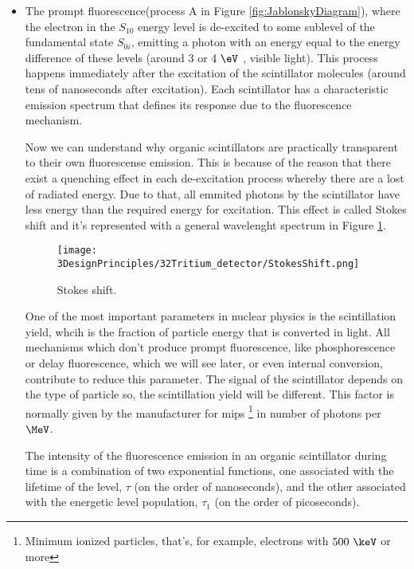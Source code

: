 \begin{itemize}

\item{} The prompt fluorescence(process A in Figure \ref{fig:JablonskyDiagram}), where the electron in the $S_{10}$ energy level  is de-excited to some sublevel of the fundamental state $S_{0i}$, emitting a photon with an energy equal to the energy difference of these levels (around $3$ or $4~\eV$ , visible light). This process happens immediately after the excitation of the scintillator molecules (around tens of nanoseconds after excitation). Each scintillator has a characteristic emission spectrum that defines its response due to the fluorescence mechanism. 

Now we can understand why organic scintillators are practically transparent to their own fluorescense emission. This is because of the reason that there exist a quenching effect in each de-excitation process whereby there are a lost of radiated energy. Due to that, all emmited  photons by the scintillator have less energy than the required energy for excitation. This effect is called Stokes shift and it's represented with a general wavelenght spectrum in Figure \ref{fig:StokesShift}.

\begin{figure}[htbp]
\centering
\texttt{[image: 3DesignPrinciples/32Tritium\_detector/StokesShift.png]}
\caption{Stokes shift.\label{fig:StokesShift}~\cite{Knoll}}
\end{figure}

One of the most important parameters in nuclear physics is the scintillation yield, whcih is the fraction of particle energy that is converted in light. All mechanisms which don't produce prompt fluorescence, like phosphorescence or delay fluorescence, which we will see later, or even internal conversion, contribute to reduce this parameter. The signal of the scintillator depends on the type of particle so, the scintillation yield will be different. This factor is normally given by the manufacturer for mips \footnote{Minimum ionized particles, that's, for example, electrons with $500~\keV$ or more} in number of photons per $\MeV$.

The intensity of the fluorescence emission in an organic scintillator during time is a combination of two exponential functions, one associated with the lifetime of the level, $\tau$ (on the order of nanoseconds), and the other associated with the energetic level population, $\tau_1$ (on the order of picoseconds).


\end{itemize}
